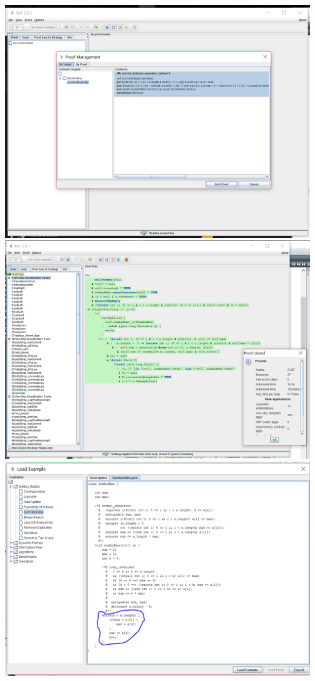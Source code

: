 \documentclass[11pt]{article}
\begin{document}
\includegraphics[scale=0.6]{min_max_pre_post.png}\\
\includegraphics[scale=0.6]{min_max_proof.png} \\ \hline
\includegraphics[scale=0.6]{min_max_while.png}
\end{document}
